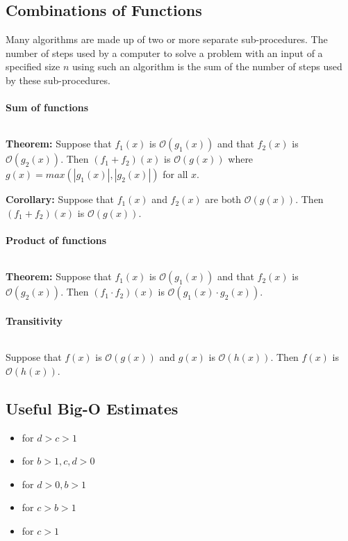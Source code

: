 \documentclass[10pt,a4paper]{book}
\begin{document}
\subsection{Combinations of Functions}
Many algorithms are made up of two or more separate sub-procedures. The number of steps used by a computer to solve a problem with an input of a specified size $n$ using such an algorithm is the sum of the number of steps used by these sub-procedures.
\paragraph*{Sum of functions}
$\ $\par
\textbf{Theorem:} Suppose that $f_{1}(x)$ is $\mathcal{O}(g_{1}(x))$ and that $f_{2}(x)$ is $\mathcal{O}(g_{2}(x))$. Then $(f_{1}+f_{2})(x)$ is $\mathcal{O}(g(x))$ where $g(x)=max(|g_1(x)|, |g_2(x)|)$ for all $x$.\par
\textbf{Corollary:} Suppose that $f_{1}(x)$ and $f_{2}(x)$ are both $\mathcal{O}(g(x))$. Then $(f_{1}+f_{2})(x)$ is $\mathcal{O}(g(x))$.
\paragraph*{Product of functions}
$\ $\par 
\textbf{Theorem:} Suppose that $f_{1}(x)$ is $\mathcal{O}(g_{1}(x))$ and that $f_{2}(x)$ is $\mathcal{O}(g_{2}(x))$. Then $(f_{1}\cdot f_{2})(x)$ is $\mathcal{O}(g_1(x)\cdot g_2(x))$.
\paragraph*{Transitivity}
$\ $\par
Suppose that $f(x)$ is $\mathcal{O}(g(x))$ and $g(x)$ is $\mathcal{O}(h(x))$. Then $f(x)$ is $\mathcal{O}(h(x))$.
\subsection{Useful Big-O Estimates}
\begin{itemize}
	\item{ for $d > c > 1$}
    \item{ for $b>1,c,d>0$}
    \item{ for $d>0,b>1$}
    \item{ for $c>b>1$}
    \item{ for $c>1$}
\end{itemize}
\end{document}
